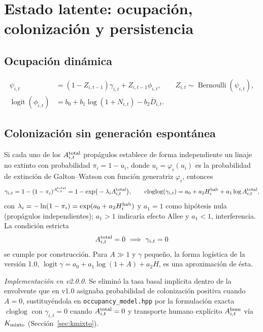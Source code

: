 \documentclass[11pt,letterpaper]{article}
\newcommand{\cloglog}{\operatorname{cloglog}}
\newcommand{\logit}{\operatorname{logit}}
\begin{document}
\section{Estado latente: ocupación, colonización y persistencia}
\subsection{Ocupación dinámica}
\begin{align}
\psi_{i,t}&=(1-Z_{i,t-1})\gamma_{i,t}+Z_{i,t-1}\phi_{i,t},\qquad Z_{i,t}\sim\operatorname{Bernoulli}(\psi_{i,t}),\\
\logit(\phi_{i,t})&=b_0+b_1\log(1+N_{i,t})-b_2\overline D_{i,t}.
\end{align}

\subsection{Colonización sin generación espontánea}
Si cada uno de los $A^{\rm total}_{i,t}$ propágulos establece de forma independiente un linaje no extinto con probabilidad $\pi_i=1-u_i$, donde $u_i=\varphi_i(u_i)$ es la probabilidad de extinción de Galton--Watson con función generatriz $\varphi_i$, entonces
\begin{equation}
\gamma_{i,t}=1-(1-\pi_i)^{A^{\rm total}_{i,t}}=1-\exp\!\big(-\lambda_iA^{\rm total}_{i,t}\big),\qquad
\cloglog(\gamma_{i,t})=a_0+a_2H^{\rm hab}_i+a_1\log A^{\rm total}_{i,t},
\end{equation}
con $\lambda_i=-\ln(1-\pi_i)=\exp(a_0+a_2H^{\rm hab}_i)$ y $a_1=1$ como hipótesis nula (propágulos independientes); $a_1>1$ indicaría efecto Allee y $a_1<1$, interferencia. La condición estricta
\begin{equation}A^{\rm total}_{i,t}=0\ \Longrightarrow\ \gamma_{i,t}=0\end{equation}
se cumple por construcción. Para $A\gg1$ y $\gamma$ pequeño, la forma logística de la versión 1.0, $\logit\gamma=a_0+a_1\log(1+A)+a_2H$, es una aproximación de ésta.

\textit{Implementación en v2.0.0.} Se eliminó la tasa basal implícita dentro de la envolvente que en v1.0 asignaba probabilidad de colonización positiva cuando $A=0$, sustituyéndola en \texttt{occupancy\_model.hpp} por la formulación exacta $\cloglog$ con $\gamma_{i,t}=0$ cuando $A^{\rm total}_{i,t}=0$ y transporte humano explícito $A^{\rm hum}_{i,t}$ vía $K_{\rm mixto}$ (Sección~\ref{sec:kmixto}).
\end{document}
